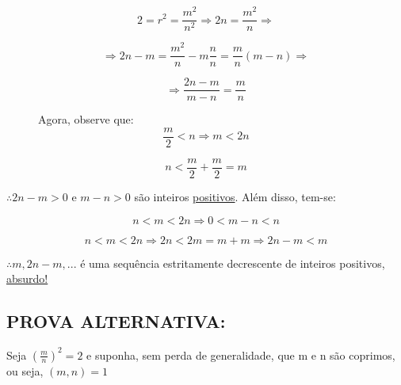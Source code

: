 \documentclass[a4paper, 12pt]{article}
\begin{document}
\[2=r^2 = \frac{m^2}{n^2} \Rightarrow 2n = \frac{m^2}{n} \Rightarrow \]

\[\Rightarrow 2n - m = \frac{m^2}{n} - m\frac{n}{n} = \frac{m}{n} (m-n) \Rightarrow\] 

\[\Rightarrow \frac{2n-m}{m-n} = \frac{m}{n}\]

\begin{figure} [h!]
    \begin{minipage}[!] {0.4\linewidth}
        \caption{}
    \end{minipage}
    \begin{minipage}[!] {0.4\linewidth}
        {Agora, observe que:}
        \[\frac{m}{2} < n \Rightarrow m < 2n\]

        \[n < \frac{m}{2} + \frac{m}{2} = m\]
    \end{minipage}
\end{figure} 

\newpage
{$\therefore 2n-m > 0$ e $ m-n > 0$ são inteiros \underline{positivos}. Além disso, tem-se:}

\[n < m < 2n \Rightarrow 0 < m-n < n\]

\[n < m < 2n \Rightarrow 2n < 2m = m + m \Rightarrow 2n - m < m\]


{$\therefore m, 2n-m,...$ é uma sequência estritamente decrescente de inteiros positivos, \underline{absurdo!}}

\subsection{PROVA ALTERNATIVA:} 

{Seja $(\frac{m}{n})^2 = 2$ e suponha, sem perda de generalidade, que m e n são coprimos, ou seja, $(m,n)=1$}
\end{document}
